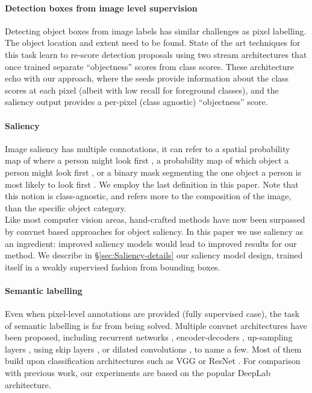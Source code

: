 \documentclass[british,10pt,twocolumn,letterpaper]{article}
\begin{document}
\paragraph{Detection boxes from image level supervision}

Detecting object boxes from image labels has similar challenges as
pixel labelling. The object location and extent need to be found.
State of the art techniques for this task \cite{Bilen2016Cvpr,Teh2016Bmvc,Kantorov2016Eccv}
learn to re-score detection proposals using two stream architectures
that once trained separate ``objectness'' scores from class scores.
These architecture echo with our approach, where the seeds provide
information about the class scores at each pixel (albeit with low
recall for foreground classes), and the saliency output provides a
per-pixel (class agnostic) ``objectness'' score.

\paragraph{Saliency}

Image saliency has multiple connotations, it can refer to a spatial
probability map of where a person might look first \cite{Yamada2010Accv},
a probability map of which object a person might look first \cite{Li2014CvprSaliency},
or a binary mask segmenting the one object a person is most likely
to look first \cite{Borji2015Tip,Shi2016Pami}. We employ the last
definition in this paper. Note that this notion is class-agnostic,
and refers more to the composition of the image, than the specific object
category.\\
Like most computer vision areas, hand-crafted methods \cite{Jiang2013Cvpr,Margolin2013Cvpr,Cheng2015Pami}
have now been surpassed by convnet based approaches \cite{Zhao2015Cvpr,Li2016Tip,Li2016Cvpr}
for object saliency. In this paper we use saliency as an ingredient:
improved saliency models would lead to improved results for our method.
We describe in \S \ref{sec:Saliency-details} our saliency model
design, trained itself in a weakly supervised fashion from bounding
boxes.

\paragraph{Semantic labelling}

Even when pixel-level annotations are provided (fully supervised case),
the task of semantic labelling is far from being solved. Multiple convnet
architectures have been proposed, including recurrent networks \cite{Pinheiro2014Icml},
encoder-decoders \cite{Noh2015Iccv,Badrinarayanan2015ArxivSegNet},
up-sampling layers \cite{Long2015Cvpr}, using skip layers \cite{Bansal2016Arxiv},
or dilated convolutions \cite{Chen2016ArxivDeeplabv2,Yu2016Iclr},
to name a few. Most of them build upon classification architectures
such as VGG \cite{Simonyan2015Iclr} or ResNet \cite{He2016Cvpr}.
For comparison with previous work, our experiments are based on the
popular DeepLab \cite{Chen2016ArxivDeeplabv2} architecture.
\end{document}
